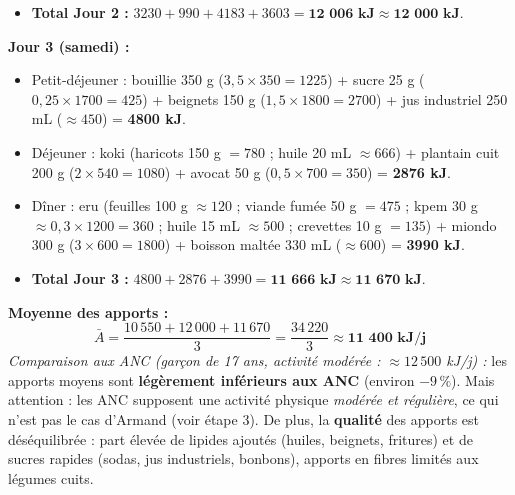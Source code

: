 \documentclass[11pt]{article}
\begin{document}
\begin{exoresolu}
\begin{itemize}
    \item \textbf{Total Jour 2 :} $3230 + 990 + 4183 + 3603 = \textbf{12 006 kJ} \approx \textbf{12 000 kJ}$.
\end{itemize}
\par
\textbf{Jour 3 (samedi) :}
\begin{itemize}
    \item Petit-déjeuner : bouillie 350 g ($3,5 \times 350 = 1225$) + sucre 25 g ($0,25 \times 1700 = 425$) + beignets 150 g ($1,5 \times 1800 = 2700$) + jus industriel 250 mL ($\approx 450$) = \textbf{4800 kJ}.
    \item Déjeuner : koki (haricots 150 g $= 780$ ; huile 20 mL $\approx 666$) + plantain cuit 200 g ($2 \times 540 = 1080$) + avocat 50 g ($0,5 \times 700 = 350$) = \textbf{2876 kJ}.
    \item Dîner : eru (feuilles 100 g $\approx 120$ ; viande fumée 50 g $= 475$ ; kpem 30 g $\approx 0,3 \times 1200 = 360$ ; huile 15 mL $\approx 500$ ; crevettes 10 g $= 135$) + miondo 300 g ($3 \times 600 = 1800$) + boisson maltée 330 mL ($\approx 600$) = \textbf{3990 kJ}.
    \item \textbf{Total Jour 3 :} $4800 + 2876 + 3990 = \textbf{11 666 kJ} \approx \textbf{11 670 kJ}$.
\end{itemize}
\par
\textbf{Moyenne des apports :}
\[
\bar{A} = \frac{10\,550 + 12\,000 + 11\,670}{3} = \frac{34\,220}{3} \approx \textbf{11 400 kJ/j}
\]
\textit{Comparaison aux ANC (garçon de 17 ans, activité modérée : $\approx 12\,500$ kJ/j) :} les apports moyens sont \textbf{légèrement inférieurs aux ANC} (environ $-9\,\%$). Mais attention : les ANC supposent une activité physique \emph{modérée et régulière}, ce qui n'est pas le cas d'Armand (voir étape 3). De plus, la \textbf{qualité} des apports est déséquilibrée : part élevée de lipides ajoutés (huiles, beignets, fritures) et de sucres rapides (sodas, jus industriels, bonbons), apports en fibres limités aux légumes cuits.


\end{exoresolu}
\end{document}
